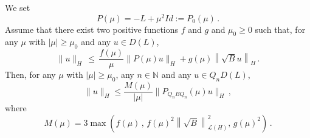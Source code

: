 \documentclass[AHL,Unicode,longabstracts]{cedram}
\newcommand{\NN}{\mathbb{N}}
\newcommand{\Lc}{\mathcal{L}}
\begin{document}
\begin{prop}\label{prop-1-appendix-high-frequencies}
We set
\[
P(\mu)=-L+\mu^2 Id:=P_0(\mu)\,.
\]
Assume that there exist two positive functions $f$ and $g$ and $\mu_0\geq 0$ such that, for any $\mu$ with $|\mu|\geq \mu_0$ and any $u\in D(L)$,
\begin{equation}\label{hyp-appendix-high-frequencies}
\|u\|_H\,\leq\,\frac{f(\mu)}\mu \|P(\mu)u\|_H + g(\mu) \left\|\sqrt{B} u\right\|_H\,.
\end{equation}
Then, for any $\mu$ with $|\mu|\geq \mu_0$, any $n\in\NN$ and any $u\in Q_nD(L)$,
\begin{equation}\label{result-prop-1-1-high-frequencies}
\|u\|_H\leq \frac{M(\mu)}{|\mu|} \|P_{Q_n B Q_n}(\mu)u\|_H\,,
\end{equation}
where
\begin{equation}\label{result-prop-1-3-appendix-high-frequencies}
M(\mu)= 3 \max \left({f(\mu)}\,,\,f(\mu)^2\left\|\sqrt{B}\right\|_{\Lc(H)}^2,\,g(\mu)^2\right)\,.
\end{equation}
\end{prop}
\end{document}

